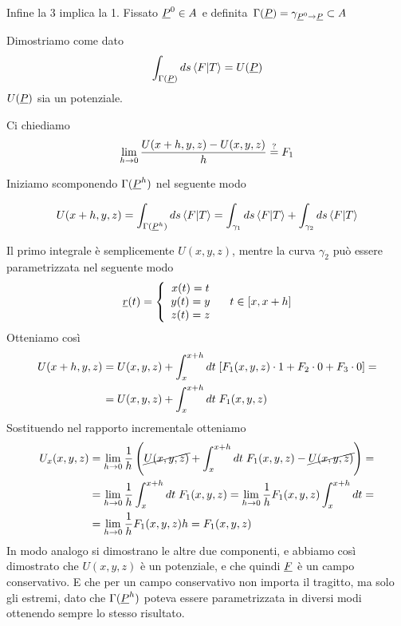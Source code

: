\newpage

Infine la 3 implica la 1. Fissato $\underline{P}^0\in A$ e definita $\Gamma(\underline{P}) = \gamma_{\underline{P}^0 \rightarrow\underline{P}}\subset A$

Dimostriamo come dato 
\begin{align}
	\int_{\Gamma(\underline{P})} ds \braket{F|T}=U(\underline{P})
\end{align}
$U(\underline{P})$ sia un potenziale.

Ci chiediamo
\begin{align}
	\underset{h \rightarrow 0}{\lim} \, \frac{U(x+h,y,z) - U(x,y,z)}{h} \overset{?}{=} F_1
\end{align}

Iniziamo scomponendo $\Gamma(\underline{P}^h)$ nel seguente modo
\begin{figure}[!htb]
\end{figure}

\begin{align}
	U(x+h,y,z) = \int_{\Gamma(\underline{P}^h)} ds \braket{F|T} = \int_{\gamma_1} ds \braket{F|T} + \int_{\gamma_2} ds \braket{F|T}
\end{align}

Il primo integrale è semplicemente $U(x,y,z)$, mentre la curva $\gamma_2$ può essere parametrizzata nel seguente modo
\begin{align}
	\underline{r}(t)= \left\{\begin{array}{cc} x(t)=t \\ y(t)=y \\ z(t)=z \end{array}\right. \quad t\in[x,x+h]
\end{align}
Otteniamo così
\begin{align}
	U(x+h,y,z) {}&= U(x,y,z) + \int_{x}^{x+h} dt \; [F_1(x,y,z) \cdot 1 + F_2 \cdot 0 + F_3 \cdot 0]= \nonumber \\
	&= U(x,y,z) + \int_{x}^{x+h} dt \; F_1(x,y,z)
\end{align}
Sostituendo nel rapporto incrementale otteniamo
\begin{align}
	U_x(x,y,z) {}&= \underset{h \rightarrow 0}{\lim} \, \frac{1}{h} \left(  \cancel{U(x,y,z)}  + \int_{x}^{x+h} dt \; F_1(x,y,z) - \cancel{U(x,y,z)} \right) = \nonumber \\
	&= \underset{h \rightarrow 0}{\lim} \, \frac{1}{h} \int_{x}^{x+h} dt \; F_1(x,y,z) = \underset{h \rightarrow 0}{\lim} \, \frac{1}{h} F_1(x,y,z) \int_{x}^{x+h} dt = \nonumber \\
	&= \underset{h \rightarrow 0}{\lim} \, \frac{1}{h} F_1(x,y,z) h = F_1(x,y,z)
\end{align}
In modo analogo si dimostrano le altre due componenti, e abbiamo così dimostrato che $U(x,y,z)$ è un potenziale, e che quindi $\underline{F}$ è un campo conservativo. E che per un campo conservativo non importa il tragitto, ma solo gli estremi, dato che $\Gamma(\underline{P}^h)$ poteva essere parametrizzata in diversi modi ottenendo sempre lo stesso risultato.

